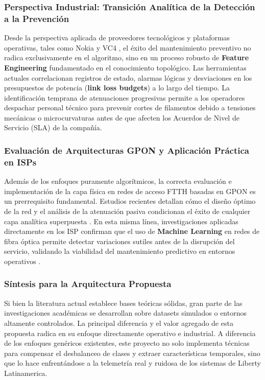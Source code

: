 \documentclass[12pt,a4paper]{article}
\begin{document}
\subsubsection{Perspectiva Industrial: Transición Analítica de la Detección a la Prevención}
Desde la perspectiva aplicada de proveedores tecnológicos y plataformas operativas, tales como Nokia \cite{nokia_predictive} y VC4 \cite{vc4_predictive}, el éxito del mantenimiento preventivo no radica exclusivamente en el algoritmo, sino en un proceso robusto de \textbf{Feature Engineering} fundamentado en el conocimiento topológico.
Las herramientas actuales correlacionan registros de estado, alarmas lógicas y desviaciones en los presupuestos de potencia (\textbf{link loss budgets}) a lo largo del tiempo. La identificación temprana de atenuaciones progresivas permite a los operadores despachar personal técnico para prevenir cortes de filamentos debido a tensiones mecánicas o microcurvaturas antes de que afecten los Acuerdos de Nivel de Servicio (SLA) de la compañía.

\subsubsection{Evaluación de Arquitecturas GPON y Aplicación Práctica en ISPs}
Además de los enfoques puramente algorítmicos, la correcta evaluación e implementación de la capa física en redes de acceso FTTH basadas en GPON es un prerrequisito fundamental. Estudios recientes detallan cómo el diseño óptimo de la red y el análisis de la atenuación pasiva condicionan el éxito de cualquier capa analítica superpuesta \cite{ftth_gpon_design}. En esta misma línea, investigaciones aplicadas directamente en los ISP confirman que el uso de \textbf{Machine Learning} en redes de fibra óptica permite detectar variaciones sutiles antes de la disrupción del 
servicio, validando la viabilidad del mantenimiento predictivo en entornos operativos \cite{isp_predictive}.

\subsubsection{Síntesis para la Arquitectura Propuesta}
Si bien la literatura actual establece bases teóricas sólidas, gran parte de las investigaciones académicas se desarrollan sobre datasets simulados o 
entornos altamente controlados. La principal diferencia y el valor agregado de esta propuesta radica en su enfoque directamente operativo e industrial.
A diferencia de los enfoques genéricos existentes, este proyecto no solo implementa técnicas para compensar el desbalanceo de clases y extraer características temporales,
sino que lo hace enfrentándose a la telemetría real y ruidosa de los sistemas de Liberty Latinamerica.\\\\
\end{document}
